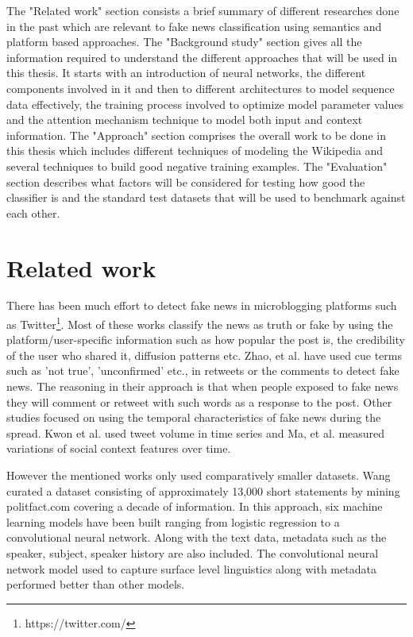 \documentclass[a4paper, 11pt]{article}
\begin{document}
The "Related work" section consists a brief summary of different researches done in the past which are relevant to fake news classification using semantics and platform based approaches. The "Background study" section gives all the information required to understand the different approaches that will be used in this thesis. It starts with an introduction of neural networks, the different components involved in it and then to different architectures to model sequence data effectively, the training process involved to optimize model parameter values and the attention mechanism technique to model both input and context information. The "Approach" section comprises the overall work to be done in this thesis which includes different techniques of modeling the Wikipedia and several techniques to build good negative training examples. The "Evaluation" section describes what factors will be considered for testing how good the classifier is and the standard test datasets that will be used to benchmark against each other.
\section{Related work}


There has been much effort to detect fake news in microblogging platforms such as Twitter\footnote{https://twitter.com/}. Most of these works \cite{Liu2015} \cite{Ma2015}classify the news as truth or fake by using the platform/user-specific information such as how popular the post is, the credibility of the user who shared it, diffusion patterns etc. Zhao, et al. \cite{Zhao2015} have used cue terms such as 'not true', 'unconfirmed' etc., in retweets or the comments to detect fake news. The reasoning in their approach is that when people exposed to fake news they will comment or retweet with such words as a response to the post. Other studies focused on using the temporal characteristics of fake news during the spread. Kwon et al.\cite{Kwon2013} used tweet volume in time series and Ma, et al.\cite{Ma2015} measured variations of social context features over time. 

However the mentioned works only used comparatively smaller datasets. Wang \cite{Wang2017} curated a dataset consisting of approximately 13,000 short statements by mining politfact.com covering a decade of information. In this approach, six machine learning models have been built ranging from logistic regression to a convolutional neural network. Along with the text data, metadata such as the speaker, subject, speaker history are also included. The convolutional neural network model used to capture surface level linguistics along with metadata performed better than other models.
\end{document}
